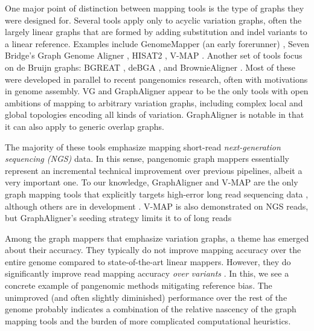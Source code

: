




One major point of distinction between mapping tools is the type of graphs they were designed for. 
Several tools apply only to acyclic variation graphs, often the largely linear graphs that are formed by adding substitution and indel variants to a linear reference.
Examples include GenomeMapper (an early forerunner) \cite{Schneeberger_2009}, Seven Bridge's Graph Genome Aligner \cite{Rakocevic_2019}, HISAT2 \cite{Kim_2019}, V-MAP \cite{Vaddadi_2019}.
Another set of tools focus on de Bruijn graphs: BGREAT \cite{Limasset_2016}, deBGA \cite{Liu_2016}, and BrownieAligner \cite{Heydari_2018}.
Most of these were developed in parallel to recent pangenomics research, often with motivations in genome assembly. 
VG \cite{Garrison_2019} and GraphAligner \cite{Rautiainen_2019b} appear to be the only tools with open ambitions of mapping to arbitrary variation graphs, including complex local and global topologies encoding all kinds of variation.
GraphAligner is notable in that it can also apply to generic overlap graphs.

The majority of these tools emphasize mapping short-read \emph{next-generation sequencing (NGS)} data. 
In this sense, pangenomic graph mappers essentially represent an incremental technical improvement over previous pipelines, albeit a very important one. 
To our knowledge, GraphAligner and V-MAP are the only graph mapping tools that explicitly targets high-error long read sequencing data \cite{Rautiainen_2019b, Vaddadi_2019}, although others are in development \cite{Li_2019}.
V-MAP is also demonstrated on NGS reads, but GraphAligner's seeding strategy limits it to of long reads


Among the graph mappers that emphasize variation graphs, a theme has emerged about their accuracy. 
They typically do not improve mapping accuracy over the entire genome compared to state-of-the-art linear mappers. 
However, they do significantly improve read mapping accuracy \emph{over variants} \cite{Garrison_2019, Rakocevic_2019, Kim_2019}. 
In this, we see a concrete example of pangenomic methods mitigating reference bias. 
The unimproved (and often slightly diminished) performance over the rest of the genome probably indicates a combination of the relative nascency of the graph mapping tools and the burden of more complicated computational heuristics.


